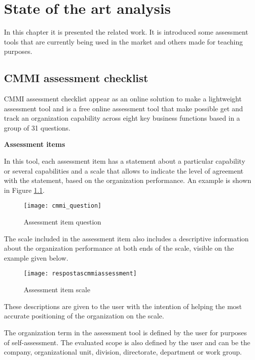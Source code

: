 \chapter{State of the art analysis}\label{chap:chap3}

In this chapter it is presented the related work. It is introduced  some assessment tools that are currently being used in the market and others made for teaching purposes.

\section{CMMI assessment checklist}

CMMI assessment checklist appear as an online solution to make a lightweight assessment tool and is a free online assessment tool that make possible get and track an organization capability across eight key business functions based in a group of 31 questions.


\textbf{Assessment items}

In this tool, each assessment item has a statement about a particular capability or several capabilities and a scale that allows to indicate the level of agreement with the statement, based on the organization performance. An example is shown in Figure \ref{fig:cmmi_question}.

\begin{figure}[h]
	\begin{center}
		\leavevmode
		\texttt{[image: cmmi\_question]}
		\caption{Assessment item question}
		\label{fig:cmmi_question}
	\end{center}
\end{figure}

The scale included in the assessment item also includes a descriptive information about the organization performance at both ends of the scale, visible on the example given below.

\begin{figure}[h]
	\begin{center}
		\leavevmode
		\texttt{[image: respostascmmiassessment]}
		\caption{Assessment item scale}
		\label{fig:assesment_answer}
	\end{center}
\end{figure}

These descriptions are given to the user with the intention of helping the most accurate positioning of the organization on the scale.

The organization term in the assessment tool is defined by the user for purposes of  self-assessment. The evaluated scope is also defined by the user and can be the company, organizational unit, division, directorate, department or work group.

